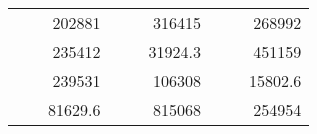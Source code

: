\begin{table}[H]
\begin{tabular}{|ccrccrccc}
\rowcolor[HTML]{DAE8FC} 
\multicolumn{1}{|c|}{\cellcolor[HTML]{FFFFC7}}                                & \multicolumn{1}{c|}{\cellcolor[HTML]{DAE8FC}}                      & \multicolumn{1}{r|}{\cellcolor[HTML]{DAE8FC}202881}    & \multicolumn{1}{c|}{\cellcolor[HTML]{FFFFC7}}                                & \multicolumn{1}{c|}{\cellcolor[HTML]{DAE8FC}}                       & \multicolumn{1}{r|}{\cellcolor[HTML]{DAE8FC}316415}    & \multicolumn{1}{c|}{\cellcolor[HTML]{FFFFC7}}                                & \multicolumn{1}{c|}{\cellcolor[HTML]{DAE8FC}}                      & \multicolumn{1}{r|}{\cellcolor[HTML]{DAE8FC}268992}    \\ \cline{3-3} \cline{6-6} \cline{9-9} 
\multicolumn{1}{|c|}{\cellcolor[HTML]{FFFFC7}}                                & \multicolumn{1}{c|}{\cellcolor[HTML]{DAE8FC}}                      & \multicolumn{1}{r|}{\cellcolor[HTML]{DDFDFF}235412}    & \multicolumn{1}{c|}{\cellcolor[HTML]{FFFFC7}}                                & \multicolumn{1}{c|}{\cellcolor[HTML]{DAE8FC}}                       & \multicolumn{1}{r|}{\cellcolor[HTML]{DDFDFF}31924.3}   & \multicolumn{1}{c|}{\cellcolor[HTML]{FFFFC7}}                                & \multicolumn{1}{c|}{\cellcolor[HTML]{DAE8FC}}                      & \multicolumn{1}{r|}{\cellcolor[HTML]{DDFDFF}451159}    \\ \cline{3-3} \cline{6-6} \cline{9-9} 
\rowcolor[HTML]{DAE8FC} 
\multicolumn{1}{|c|}{\cellcolor[HTML]{FFFFC7}}                                & \multicolumn{1}{c|}{\cellcolor[HTML]{DAE8FC}}                      & \multicolumn{1}{r|}{\cellcolor[HTML]{DAE8FC}239531}    & \multicolumn{1}{c|}{\cellcolor[HTML]{FFFFC7}}                                & \multicolumn{1}{c|}{\cellcolor[HTML]{DAE8FC}}                       & \multicolumn{1}{r|}{\cellcolor[HTML]{DAE8FC}106308}    & \multicolumn{1}{c|}{\cellcolor[HTML]{FFFFC7}}                                & \multicolumn{1}{c|}{\cellcolor[HTML]{DAE8FC}}                      & \multicolumn{1}{r|}{\cellcolor[HTML]{DAE8FC}15802.6}   \\ \cline{3-3} \cline{6-6} \cline{9-9} 
\multicolumn{1}{|c|}{\cellcolor[HTML]{FFFFC7}}                                & \multicolumn{1}{c|}{\cellcolor[HTML]{DAE8FC}}                      & \multicolumn{1}{r|}{\cellcolor[HTML]{DDFDFF}81629.6}   & \multicolumn{1}{c|}{\cellcolor[HTML]{FFFFC7}}                                & \multicolumn{1}{c|}{\cellcolor[HTML]{DAE8FC}}                       & \multicolumn{1}{r|}{\cellcolor[HTML]{DDFDFF}815068}    & \multicolumn{1}{c|}{\cellcolor[HTML]{FFFFC7}}                                & \multicolumn{1}{c|}{\cellcolor[HTML]{DAE8FC}}                      & \multicolumn{1}{r|}{\cellcolor[HTML]{DDFDFF}254954}    \\ \cline{3-3} \cline{6-6} \cline{9-9} 

\end{tabular}
\end{table}
